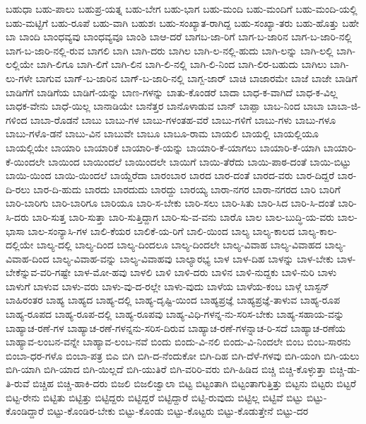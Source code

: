 {ಬಹುಧಾ
ಬಹು-ಪಾಲು
ಬಹುಪ್ರ-ಯತ್ನ
ಬಹು-ಬೇಗ
ಬಹು-ಭಾಗ
ಬಹು-ಮಂದಿ
ಬಹು-ಮಂದಿಗೆ
ಬಹು-ಮಂದಿ-ಯಲ್ಲಿ
ಬಹು-ಮಟ್ಟಿಗೆ
ಬಹು-ರೂಪೆ
ಬಹು-ವಾಗಿ
ಬಹುಶಃ
ಬಹು-ಸಂಖ್ಯಾತ-ರಾಗಿದ್ದ
ಬಹು-ಸಂಖ್ಯಾ-ತರು
ಬಹು-ಹೊತ್ತು
ಬಹೇ
ಬಾ
ಬಾಂದಿ
ಬಾಂಧವ್ಯವು
ಬಾಂಧವ್ಯವೂ
ಬಾಂಶಿ
ಬಾಆ-ದರೆ
ಬಾಗಬ-ಜಾ-ರಿಗೆ
ಬಾಗ-ಬ-ಜಾರಿನ
ಬಾಗ-ಬ-ಜಾರಿ-ನಲ್ಲಿ
ಬಾಗ-ಬ-ಜಾರಿ-ನಲ್ಲಿ-ರುವ
ಬಾಗಲಿ
ಬಾಗಿ
ಬಾಗಿ-ದರು
ಬಾಗಿಲ
ಬಾಗಿ-ಲ-ನಲ್ಲಿ-ಹುದು
ಬಾಗಿ-ಲನ್ನು
ಬಾಗಿ-ಲಲ್ಲಿ
ಬಾಗಿ-ಲಲ್ಲಿಯೇ
ಬಾಗಿ-ಲಿಗೂ
ಬಾಗಿ-ಲಿಗೆ
ಬಾಗಿ-ಲಿನ
ಬಾಗಿ-ಲಿ-ನಲ್ಲಿ
ಬಾಗಿ-ಲಿ-ನಿಂದ
ಬಾಗಿ-ಲಿರ-ಬಹುದು
ಬಾಗಿಲು
ಬಾಗಿ-ಲು-ಗಳೇ
ಬಾಗುವ
ಬಾಗ್-ಬ-ಜಾರಿನ
ಬಾಗ್-ಬ-ಜಾರಿ-ನಲ್ಲಿ
ಬಾಗ್ಬ-ಜಾರ್
ಬಾಚಿ
ಬಾಜಾರಮೇ
ಬಾಜೆ
ಬಾಜೇ
ಬಾಡಿಗೆ
ಬಾಡಿಗೆಗೆ
ಬಾಡಿಗೆಯ
ಬಾಡಿಗೆ-ಯನ್ನು
ಬಾಣ-ಗಳನ್ನು
ಬಾತು-ಕೊಂಡರೆ
ಬಾದಾ
ಬಾಧ-ಕ-ವಾಗಿದೆ
ಬಾಧ-ಕ-ವಿಲ್ಲ
ಬಾಧಕ-ವೇನು
ಬಾಧೆ-ಯಿಲ್ಲ
ಬಾನಾಡಿಯೇ
ಬಾನೆತ್ತರ
ಬಾನೊಳಾಡುವ
ಬಾನ್
ಬಾಪ್ಪಾ
ಬಾಬ-ನಿಂದ
ಬಾಬಾ
ಬಾಬಾ-ಜಿ-ಗಳಿಂದ
ಬಾಬಾ-ರೊಡನೆ
ಬಾಬು
ಬಾಬು-ಗಳ
ಬಾಬು-ಗಳಂತಹ-ವರೆ
ಬಾಬು-ಗಳಿಗೆ
ಬಾಬು-ಗಳು
ಬಾಬು-ಗಳೂ
ಬಾಬು-ಗಳೊ-ಡನೆ
ಬಾಬು-ವಿನ
ಬಾಬುವೇ
ಬಾಬೂ
ಬಾಬೂ-ರಾಮ
ಬಾಯಲಿ
ಬಾಯಲ್ಲಿ
ಬಾಯಲ್ಲಿಯೂ
ಬಾಯಲ್ಲಿಯೇ
ಬಾಯಾರಿ
ಬಾಯಾರಿಕೆ
ಬಾಯಾರಿ-ಕೆ-ಯನ್ನು
ಬಾಯಾರಿ-ಕೆ-ಯಾಗಲು
ಬಾಯಾರಿ-ಕೆ-ಯಾಗಿ
ಬಾಯಾರಿ-ಕೆ-ಯಿಂದಲೇ
ಬಾಯಿಂದ
ಬಾಯಿಂದಲೆ
ಬಾಯಿಂದಲೇ
ಬಾಯಿಗೆ
ಬಾಯಿ-ತೆರೆದು
ಬಾಯಿ-ಪಾಠ-ದಂತೆ
ಬಾಯಿ-ಬಿಟ್ಟು
ಬಾಯಿ-ಯಿಂದ
ಬಾಯಿ-ಯಿಂದಲೆ
ಬಾಯ್ದೆರೆದಾ
ಬಾರಂಬಾರ
ಬಾರದ
ಬಾರ-ದಂತೆ
ಬಾರದ-ವರು
ಬಾರ-ದಿದ್ದರೆ
ಬಾರ-ದಿ-ರಲು
ಬಾರ-ದಿ-ಹುದು
ಬಾರದು
ಬಾರದುದು
ಬಾರದ್ದು
ಬಾರಯ್ಯ
ಬಾರಾ-ನಗರ
ಬಾರಾ-ನಗರದ
ಬಾರಿ
ಬಾರಿಗೆ
ಬಾರಿ-ಬಾರಿಗು
ಬಾರಿ-ಬಾರಿಗೂ
ಬಾರಿಯೂ
ಬಾರಿ-ಸ-ಬೇಕು
ಬಾರಿ-ಸಲು
ಬಾರಿ-ಸಿತು
ಬಾರಿ-ಸಿದ
ಬಾರಿ-ಸಿ-ದಂತೆ
ಬಾರಿ-ಸಿ-ದರು
ಬಾರಿ-ಸುತ್ತ
ಬಾರಿ-ಸುತ್ತಾ
ಬಾರಿ-ಸುತ್ತಿದ್ದಾಗ
ಬಾರಿ-ಸು-ವ-ವನು
ಬಾರೊ
ಬಾಲ
ಬಾಲ-ಬುದ್ಧಿ-ಯ-ವರು
ಬಾಲ-ಭಾಸಾ
ಬಾಲ-ಸಂನ್ಯಾಸಿ-ಗಳ
ಬಾಲಿ-ಕೆಯರ
ಬಾಲಿಕೆ-ಯ-ರಿಗೆ
ಬಾಲಿ-ಯಿಂದ
ಬಾಲ್ಯ
ಬಾಲ್ಯ-ಕಾಲದ
ಬಾಲ್ಯ-ಕಾಲ-ದಲ್ಲಿಯೇ
ಬಾಲ್ಯ-ದಲ್ಲಿ
ಬಾಲ್ಯ-ದಿಂದ
ಬಾಲ್ಯ-ದಿಂದಲೂ
ಬಾಲ್ಯ-ದಿಂದಲೇ
ಬಾಲ್ಯ-ವಿವಾಹ
ಬಾಲ್ಯ-ವಿವಾಹದ
ಬಾಲ್ಯ-ವಿವಾಹ-ದಿಂದ
ಬಾಲ್ಯ-ವಿವಾಹ-ವನ್ನು
ಬಾಲ್ಯ-ವಿವಾಹವು
ಬಾಲ್ಯಾರಭ್ಯ
ಬಾಳ
ಬಾಳ-ದಿಹ
ಬಾಳನ್ನು
ಬಾಳ-ಬೇಕು
ಬಾಳ-ಬೇಕೆನ್ನುವ-ವರಿ-ಗಷ್ಟೇ
ಬಾಳ-ಮೋ-ಹವು
ಬಾಳಲಿ
ಬಾಳಿ
ಬಾಳಿ-ದರು
ಬಾಳಿನ
ಬಾಳಿ-ನುದ್ದಕು
ಬಾಳಿ-ನುರಿ
ಬಾಳು
ಬಾಳುಗೆ
ಬಾಳುವ
ಬಾಳು-ವರು
ಬಾಳು-ವು-ದ-ರಲ್ಲೇ
ಬಾಳು-ವುದು
ಬಾಳೆಯ
ಬಾಳೆಯ-ಕಂಬ
ಬಾಳ್ಗೆ
ಬಾಸ್ಟನ್
ಬಾಹಿರಂತರ
ಬಾಹ್ಯ
ಬಾಹ್ಯದ
ಬಾಹ್ಯ-ದಲ್ಲಿ
ಬಾಹ್ಯ-ದೃಷ್ಟಿ-ಯಿಂದ
ಬಾಹ್ಯಪ್ರಜ್ಞೆ
ಬಾಹ್ಯಪ್ರಜ್ಞೆ-ತಾಳುವ
ಬಾಹ್ಯ-ರೂಪ
ಬಾಹ್ಯ-ರೂಪದ
ಬಾಹ್ಯ-ರೂಪ-ದಲ್ಲಿ
ಬಾಹ್ಯ-ರೂಪವು
ಬಾಹ್ಯ-ವಿಧಿ-ಗಳನ್ನ-ನು-ಸರಿಸ-ಬೇಕು
ಬಾಹ್ಯ-ಸಹಾಯ-ವನ್ನು
ಬಾಹ್ಯಾಚ-ರಣೆ-ಗಳ
ಬಾಹ್ಯಾಚ-ರಣೆ-ಗಳನ್ನನು-ಸರಿಸ-ದಿರುವ
ಬಾಹ್ಯಾಚ-ರಣೆ-ಗಳನ್ನಾಚ-ರಿ-ಸದೆ
ಬಾಹ್ಯಾಚ-ರಣೆಯ
ಬಾಹ್ಯಾವ-ಲಂಬನ-ವನ್ನೇ
ಬಾಹ್ಯಾವ-ಲಂಬ-ನವೆ
ಬಿಂದು
ಬಿಂದು-ವಿ-ನಲಿ
ಬಿಂದು-ವಿ-ನಿಂದಲೇ
ಬಿಂಬ
ಬಿಂಬ-ಸಾರನು
ಬಿಂಬಾ-ಧರ-ಗಳೊ
ಬಿಂಬಾ-ಪತ್ರ
ಬಿಎ
ಬಿಗಿ
ಬಿಗಿ-ದ-ನೆಂದುಕೋ
ಬಿಗಿ-ದಿಹ
ಬಿಗಿ-ದೆಳೆ-ಗಳವು
ಬಿಗಿ-ಯಂಗಿ
ಬಿಗಿ-ಯಲು
ಬಿಗಿ-ಯಾಗಿ
ಬಿಗಿ-ಯಾದ
ಬಿಗಿ-ಯಿಲ್ಲದೆ
ಬಿಗಿ-ಯುತಿರೆ
ಬಿಗಿ-ವರಿರಿ-ವರು
ಬಿಗಿ-ಹಿಡಿದ
ಬಿಚ್ಚಿ
ಬಿಚ್ಚಿ-ಕೊಳ್ಳುತ್ತಾ
ಬಿಚ್ಚಿ-ಡು-ತಿ-ರುವೆ
ಬಿಚ್ಚಿಹ
ಬಿಚ್ಚಿ-ಹಾಕಿ-ದರು
ಬಿಜಲಿ
ಬಿಜಲಿಜ್ವಾಲಾ
ಬಿಟ್ಟ
ಬಿಟ್ಟಂತಾಗಿ
ಬಿಟ್ಟಂತಾಗುತ್ತಿತ್ತು
ಬಿಟ್ಟನು
ಬಿಟ್ಟರು
ಬಿಟ್ಟರೆ
ಬಿಟ್ಟ-ರೇನು
ಬಿಟ್ಟಿತು
ಬಿಟ್ಟಿತ್ತು
ಬಿಟ್ಟಿದ್ದರು
ಬಿಟ್ಟಿದ್ದರೆ
ಬಿಟ್ಟಿದ್ದಾರೆ
ಬಿಟ್ಟಿ-ರುವುದು
ಬಿಟ್ಟಿಲ್ಲ
ಬಿಟ್ಟಿವೆ
ಬಿಟ್ಟು
ಬಿಟ್ಟು-ಕೊಂಡಿದ್ದಾರೆ
ಬಿಟ್ಟು-ಕೊಂಡಿರ-ಬೇಕು
ಬಿಟ್ಟು-ಕೊಂಡು
ಬಿಟ್ಟು-ಕೊಟ್ಟರು
ಬಿಟ್ಟು-ಕೊಡುತ್ತೇನೆ
ಬಿಟ್ಟು-ದರ
}
